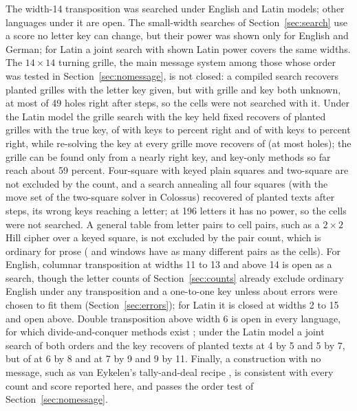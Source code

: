 \documentclass[11pt]{article}
\theoremstyle{definition}
\begin{document}
The width-14 transposition was searched under English and Latin models; other languages under it are open. The small-width searches of Section~\ref{sec:search} use a score no letter key can change, but their power was shown only for English and German; for Latin a joint search with shown Latin power covers the same widths. The $14 \times 14$ turning grille, the main message system among those whose order was tested in Section~\ref{sec:nomessage}, is not closed: a compiled search recovers \grilleKnown{} planted grilles with the letter key given, but \grilleJoint{} with grille and key both unknown, at most \grilleJointHolesHigh{} of 49 holes right after \grilleJointSteps{} steps, so the cells were not searched with it. Under the Latin model the grille search with the key held fixed recovers \lgExact{} of \lgPlanted{} planted grilles with the true key, \lgMid{} of \lgPlanted{} with keys \lgMidLow{} to \lgMidHigh{} percent right and \lgLow{} of \lgPlanted{} with keys \lgLowLow{} to \lgLowHigh{} percent right, while re-solving the key at every grille move recovers \lgNested{} of \lgNestedOf{} (at most \lgNestedHoles{} holes); the grille can be found only from a nearly right key, and key-only methods so far reach about 59 percent. Four-square with keyed plain squares and two-square are not excluded by the count, and a search annealing all four squares (with the move set of the two-square solver in Colossus) recovered \ksRecovered{} of \ksPlanted{} planted texts after \ksSteps{} steps, its wrong keys reaching \ksWrong{} a letter; at 196 letters it has no power, so the cells were not searched. A general table from letter pairs to cell pairs, such as a $2 \times 2$ Hill cipher over a keyed square, is not excluded by the pair count, which is ordinary for prose (\pairCellsAMany{} and \pairCellsBMany{} windows have as many different pairs as the cells). For English, columnar transposition at widths 11 to 13 and above 14 is open as a search, though the letter counts of Section~\ref{sec:counts} already exclude ordinary English under any transposition and a one-to-one key unless about \corpusClosestDistance{} errors were chosen to fit them (Section~\ref{sec:errors}); for Latin it is closed at widths 2 to 15 and open above. Double transposition above width 6 is open in every language, for which divide-and-conquer methods exist \cite{lasry2014}; under the Latin model a joint search of both orders and the key recovers \ldSmall{} of \ldSmallOf{} planted texts at 4 by 5 and 5 by 7, but \ldSix{} of \ldSixOf{} at 6 by 8 and \ldLarge{} at 7 by 9 and 9 by 11. Finally, a construction with no message, such as van Eykelen's tally-and-deal recipe \cite{vaneykelen2026xv}, is consistent with every count and score reported here, and passes the order test of Section~\ref{sec:nomessage}.
\end{document}
